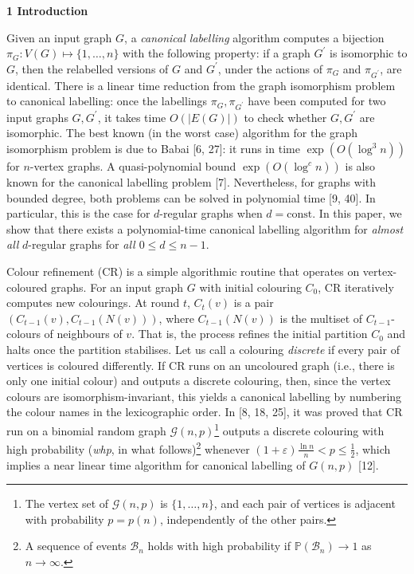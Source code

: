 

\par\medskip\noindent\textbf{
1 Introduction}\par




Given an input graph $G$, a \emph{canonical labelling} algorithm computes a bijection $\pi_{G}:V(G)\mapsto\{1,\ldots,n\}$ with the following property: if a graph $G^{\prime}$ is isomorphic to $G$, then the relabelled versions of $G$ and $G^{\prime}$, under the actions of $\pi_{G}$ and $\pi_{G^{\prime}}$, are identical. There is a linear time reduction from the graph isomorphism problem to canonical labelling: once the labellings $\pi_{G},\pi_{G^{\prime}}$ have been computed for two input graphs $G,G^{\prime}$, it takes time $O(|E(G)|)$ to check whether $G,G^{\prime}$ are isomorphic. The best known (in the worst case) algorithm for the graph isomorphism problem is due to Babai [6, 27]: it runs in time $\exp(O(\log^{3}n))$ for $n$-vertex graphs. A quasi-polynomial bound $\exp(O(\log^{c}n))$ is also known for the canonical labelling problem [7]. Nevertheless, for graphs with bounded degree, both problems can be solved in polynomial time [9, 40]. In particular, this is the case for $d$-regular graphs when $d=\mathrm{const}.$ In this paper, we show that there exists a polynomial-time canonical labelling algorithm for \emph{almost all} $d$-regular graphs for \emph{all $0\leq d\leq n-1$}.\par




Colour refinement (CR) is a simple algorithmic routine that operates on vertex-coloured graphs. For an input graph
$G$ with initial colouring $C_{0}$, CR iteratively computes new colourings. At round $t$, $C_{t}(v)$ is a pair $(C_{t-1}(v),C_{t-1}(N(v)))$, where $C_{t-1}(N(v))$ is the multiset of $C_{t-1}$-colours of neighbours of $v$. That is, the process refines the initial partition $C_{0}$ and halts once the partition stabilises. Let us call a colouring \emph{discrete} if every pair of vertices is coloured differently. If CR runs on an uncoloured graph (i.e., there is only one initial colour) and outputs a discrete colouring, then, since the vertex colours are isomorphism-invariant, this yields a canonical labelling by numbering the colour names in the lexicographic order. In [8, 18, 25], it was proved that CR run on a binomial random graph $\mathcal{G}(n,p)$\footnote{The vertex set of $\mathcal{G}(n,p)$ is $\{1,\ldots,n\}$, and each pair of vertices is adjacent with probability $p=p(n)$, independently of the other pairs.} outputs a discrete colouring with high probability (\emph{whp}, in what follows)\footnote{A sequence of events $\mathcal{B}_{n}$ holds with high probability if $\mathbb{P}(\mathcal{B}_{n})\to 1$ as $n\to\infty$.} whenever $(1+\varepsilon)\frac{\ln n}{n}<p\leq\frac{1}{2}$, which implies a near linear time algorithm for canonical labelling of $G(n,p)$ [12].\par




